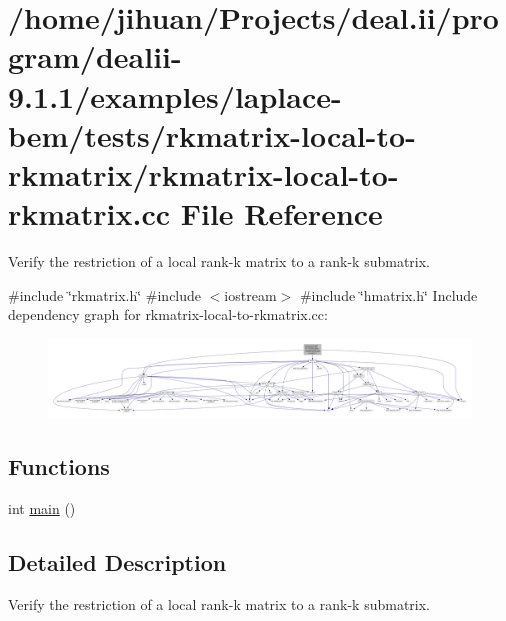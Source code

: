\hypertarget{rkmatrix-local-to-rkmatrix_8cc}{}\section{/home/jihuan/\+Projects/deal.ii/program/dealii-\/9.1.1/examples/laplace-\/bem/tests/rkmatrix-\/local-\/to-\/rkmatrix/rkmatrix-\/local-\/to-\/rkmatrix.cc File Reference}
\label{rkmatrix-local-to-rkmatrix_8cc}


Verify the restriction of a local rank-\/k matrix to a rank-\/k submatrix.  


{\ttfamily \#include \char`\"{}rkmatrix.\+h\char`\"{}}\newline
{\ttfamily \#include $<$iostream$>$}\newline
{\ttfamily \#include \char`\"{}hmatrix.\+h\char`\"{}}\newline
Include dependency graph for rkmatrix-\/local-\/to-\/rkmatrix.cc\+:
\nopagebreak
\begin{figure}[H]
\begin{center}
\leavevmode
\includegraphics[width=350pt]{rkmatrix-local-to-rkmatrix_8cc__incl}
\end{center}
\end{figure}
\subsection*{Functions}
\begin{DoxyCompactItemize}
\item 
int \hyperlink{rkmatrix-local-to-rkmatrix_8cc_ae66f6b31b5ad750f1fe042a706a4e3d4}{main} ()
\end{DoxyCompactItemize}


\subsection{Detailed Description}
Verify the restriction of a local rank-\/k matrix to a rank-\/k submatrix. 

